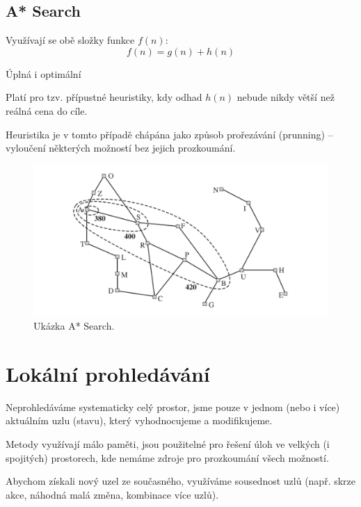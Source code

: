 \subsection{A* Search}

\begin{compactitem}
    \item Využívají se obě složky funkce $f(n)$:
    $$ f(n) = g(n) + h(n) $$

    \item Úplná i optimální \begin{compactitem}
        \item Platí pro tzv. přípustné heuristiky, kdy odhad $h(n)$ nebude nikdy větší než reálná cena do cíle.
    \end{compactitem}

    \item Heuristika je v tomto případě chápána jako způsob prořezávání (prunning) -- vyloučení některých možností bez jejich prozkoumání.

    \begin{figure}[H]
        \centering
        \includegraphics[width=1\linewidth]{a_star.png}
        \caption{Ukázka A* Search.}
    \end{figure}
\end{compactitem}


\section{Lokální prohledávání}

\begin{compactitem}
    \item Neprohledáváme systematicky celý prostor, jsme pouze v jednom (nebo i více) aktuálním uzlu (stavu), který vyhodnocujeme a modifikujeme.

    \item Metody využívají málo paměti, jsou použitelné pro řešení úloh ve velkých (i spojitých) prostorech, kde nemáme zdroje pro prozkoumání všech možností.

    \item Abychom získali nový uzel ze současného, využíváme sousednost uzlů (např. skrze akce, náhodná malá změna, kombinace více uzlů).
\end{compactitem}


